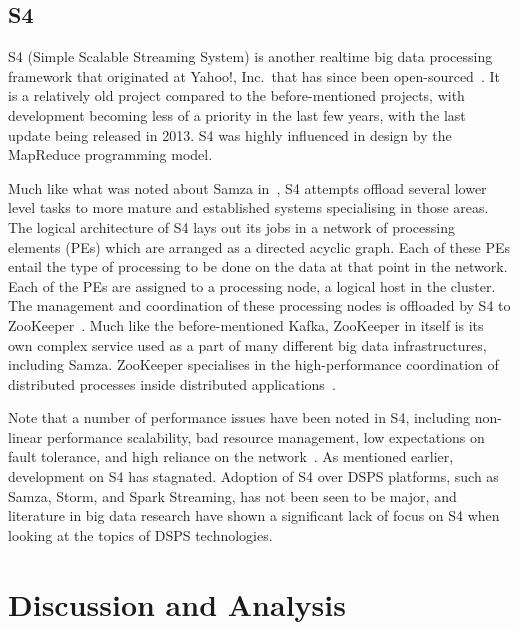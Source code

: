 

\subsection{S4} %
\label{ssub:s4}

S4 (Simple Scalable Streaming System) is another realtime big data processing framework that originated at Yahoo!, Inc.\
that has since been open-sourced~\cite{neumeyer2010s4}. It is a relatively old project compared to the before-mentioned
projects, with development becoming less of a priority in the last few years, with the last update being released in 2013.
S4 was highly influenced in design by the MapReduce programming model.

Much like what was noted about Samza in~, S4 attempts offload several lower level tasks to more
mature and established systems specialising in those areas. The logical architecture of S4 lays out its jobs in a
network of processing elements (PEs) which are arranged as a directed acyclic graph. Each of these PEs entail the type
of processing to be done on the data at that point in the network. Each of the PEs are assigned to a processing node, a
logical host in the cluster. The management and coordination of these processing nodes is offloaded by S4 to
ZooKeeper~\cite{kamburugamuve_survey_2014}. Much like the before-mentioned Kafka, ZooKeeper in itself is its own complex
service used as a part of many different big data infrastructures, including Samza. ZooKeeper specialises in the
high-performance coordination of distributed processes inside distributed applications~\cite{hunt2010zookeeper}.

Note that a number of performance issues have been noted in S4, including non-linear performance scalability, bad
resource management, low expectations on fault tolerance, and high reliance on the network~\cite{chauhan2012performance}.
As mentioned earlier, development on S4 has stagnated. Adoption of S4 over DSPS platforms, such as Samza, Storm,
and Spark Streaming, has not been seen to be major, and literature in big data research have shown a significant lack of
focus on S4 when looking at the topics of DSPS technologies.




\section{Discussion and Analysis} %
\label{sub:processing_conclusion}

